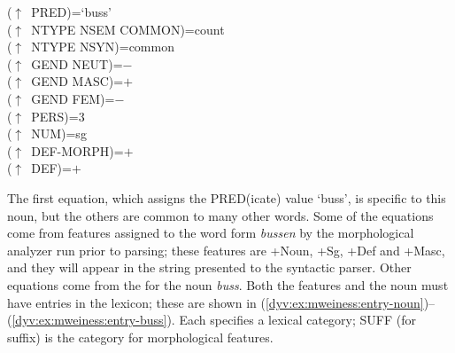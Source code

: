 \documentclass[output=paper]{langsci/langscibook}
\begin{document}


\ea\label{dyv:ex:mweiness:f-descr-bussen}
{\small 
($\uparrow$~PRED)=`buss' \\
($\uparrow$~NTYPE NSEM COMMON)=count \\
($\uparrow$~NTYPE NSYN)=common \\
($\uparrow$~GEND NEUT)=$-$ \\
($\uparrow$~GEND MASC)=$+$ \\
($\uparrow$~GEND FEM)=$-$ \\
($\uparrow$~PERS)=3 \\
($\uparrow$~NUM)=sg \\
($\uparrow$~DEF-MORPH)=$+$ \\
($\uparrow$~DEF)=$+$ \\
}
\z

The first equation, which assigns the PRED(icate) value `buss', is specific to this noun, but the others are common to many other words.
Some of the equations come from features assigned to the word form \textit{bussen} by the morphological analyzer run prior to parsing; these features are +Noun, +Sg, +Def and +Masc, and they will appear in the string presented to the syntactic parser.
Other equations come from the  for the noun  \textit{buss}.
Both the features and the noun must have entries in the lexicon;  these are shown in (\ref{dyv:ex:mweiness:entry-noun})--(\ref{dyv:ex:mweiness:entry-buss}).
Each  specifies a lexical category; SUFF (for suffix) is the category for morphological features.
\end{document}
